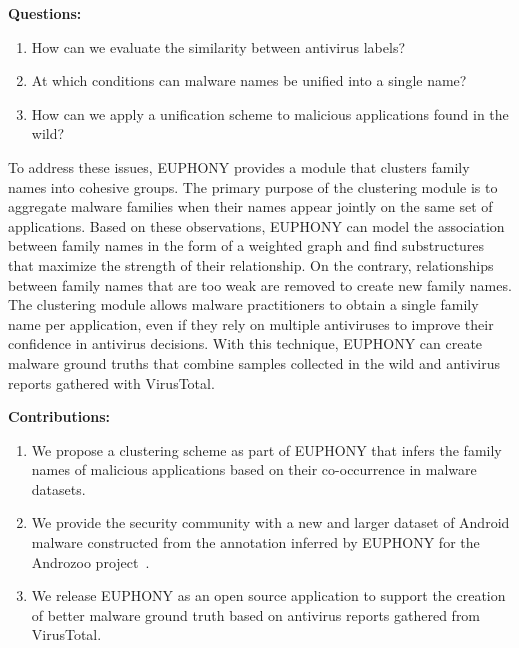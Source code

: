 \begin{mdframed}[hidealllines=true,nobreak=true]
\textbf{Questions:}

\begin{enumerate}
	\item How can we evaluate the similarity between antivirus labels?
	\item At which conditions can malware names be unified into a single name?
	\item How can we apply a unification scheme to malicious applications found in the wild?
\end{enumerate}
\end{mdframed}

To address these issues, EUPHONY provides a module that clusters family names into cohesive groups.
The primary purpose of the clustering module is to aggregate malware families when their names appear jointly on the same set of applications.
Based on these observations, EUPHONY can model the association between family names in the form of a weighted graph and find substructures that maximize the strength of their relationship.
On the contrary, relationships between family names that are too weak are removed to create new family names.
The clustering module allows malware practitioners to obtain a single family name per application, even if they rely on multiple antiviruses to improve their confidence in antivirus decisions.
With this technique, EUPHONY can create malware ground truths that combine samples collected in the wild and antivirus reports gathered with VirusTotal.

\begin{mdframed}[hidealllines=true,nobreak=true]
\textbf{Contributions:}

\begin{enumerate}
	\item We propose a clustering scheme as part of EUPHONY that infers the family names of malicious applications based on their co-occurrence in malware datasets.
        \item We provide the security community with a new and larger dataset of Android malware constructed from the annotation inferred by EUPHONY for the Androzoo project~\cite{allix_androzoo:_2016}.
	\item We release EUPHONY as an open source application to support the creation of better malware ground truth based on antivirus reports gathered from VirusTotal.
\end{enumerate}
\end{mdframed}

